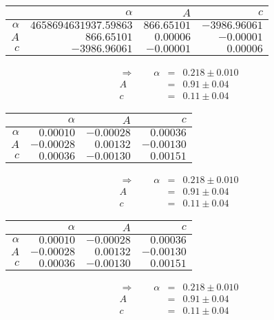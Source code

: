  \begin{tabular}{|r|r|r|r|}
 \hline 
\cellcolor{tabcolor}&\cellcolor{tabcolor}$\alpha$&\cellcolor{tabcolor}$A$&\cellcolor{tabcolor}$c$\\ \hline 
 \cellcolor{tabcolor}$\alpha$&$4658694631937.59863$ &$866.65101$ &$-3986.96061$ \\ \hline
\cellcolor{tabcolor}$A$&$866.65101$ &$0.00006$ &$-0.00001$ \\ \hline
\cellcolor{tabcolor}$c$&$-3986.96061$ &$-0.00001$ &$0.00006$ \\ \hline
\end{tabular}
\begin{align}\Rightarrow \qquad
    \alpha &=& 0.218 \pm 0.010 \\
    A &=& 0.91 \pm 0.04 \\
    c &=& 0.11 \pm 0.04 
\end{align}

 \begin{tabular}{|r|r|r|r|}
 \hline 
\cellcolor{tabcolor}&\cellcolor{tabcolor}$\alpha$&\cellcolor{tabcolor}$A$&\cellcolor{tabcolor}$c$\\ \hline 
 \cellcolor{tabcolor}$\alpha$&$0.00010$ &$-0.00028$ &$0.00036$ \\ \hline
\cellcolor{tabcolor}$A$&$-0.00028$ &$0.00132$ &$-0.00130$ \\ \hline
\cellcolor{tabcolor}$c$&$0.00036$ &$-0.00130$ &$0.00151$ \\ \hline
\end{tabular}
\begin{align}\Rightarrow \qquad
    \alpha &=& 0.218 \pm 0.010 \\
    A &=& 0.91 \pm 0.04 \\
    c &=& 0.11 \pm 0.04 
\end{align}

 \begin{tabular}{|r|r|r|r|}
 \hline 
\cellcolor{tabcolor}&\cellcolor{tabcolor}$\alpha$&\cellcolor{tabcolor}$A$&\cellcolor{tabcolor}$c$\\ \hline 
 \cellcolor{tabcolor}$\alpha$&$0.00010$ &$-0.00028$ &$0.00036$ \\ \hline
\cellcolor{tabcolor}$A$&$-0.00028$ &$0.00132$ &$-0.00130$ \\ \hline
\cellcolor{tabcolor}$c$&$0.00036$ &$-0.00130$ &$0.00151$ \\ \hline
\end{tabular}
\begin{align}\Rightarrow \qquad
    \alpha &=& 0.218 \pm 0.010 \\
    A &=& 0.91 \pm 0.04 \\
    c &=& 0.11 \pm 0.04 
\end{align}

